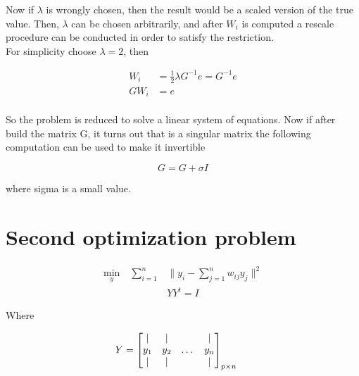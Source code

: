 \documentclass{article}
\begin{document}
    Now if $\lambda$ is wrongly chosen, then the result would be a scaled version
    of the true value. Then, $\lambda$ can be chosen arbitrarily, and after $W_i$
    is computed a rescale procedure can be conducted in order to satisfy the
    restriction.\\

    For simplicity choose $\lambda = 2$, then

    \begin{equation*}
        \begin{aligned}
            W_i &= \frac{1}{2} \lambda G^{-1} e = G^{-1} e \\
            G W_i &= e \\
        \end{aligned}
    \end{equation*}

    So the problem is reduced to solve a linear system of equations. Now if
    after build the matrix G, it turns out that is a singular matrix the
    following computation can be used to make it invertible

    \begin{equation*}
            G = G + \sigma I
    \end{equation*}

    where sigma is a small value.

    \section{Second optimization problem}

    \begin{equation*}
        \begin{aligned}
            \underset{y}{\text{min}} \quad \sum_{i=1}^n & \lVert y_i - \sum_{j=1}^n w_{ij} y_j \rVert^2 \\
            & YY^t = I
        \end{aligned}
    \end{equation*}

    Where

    \[
        Y = 
        \begin{bmatrix}
            |   &  |  &       & |   \\
            y_1 & y_2 & \dots & y_n \\
            |   &  |  &       & |
        \end{bmatrix}_{p \times n}
        \hspace{0.5cm}
    \]
\end{document}
